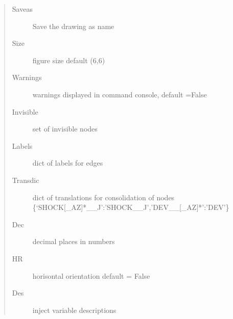 \documentclass[letterpaper,10pt,english]{sphinxmanual}
\begin{document}
\begin{fulllineitems}
\begin{fulllineitems}
\begin{quote}
\begin{description}
\item[{Saveas}] \leavevmode
\sphinxAtStartPar
Save the drawing as name

\item[{Size}] \leavevmode
\sphinxAtStartPar
figure size default (6,6)

\item[{Warnings}] \leavevmode
\sphinxAtStartPar
warnings displayed in command console, default =False

\item[{Invisible}] \leavevmode
\sphinxAtStartPar
set of invisible nodes

\item[{Labels}] \leavevmode
\sphinxAtStartPar
dict of labels for edges

\item[{Transdic}] \leavevmode
\sphinxAtStartPar
dict of translations for consolidation of nodes \{‘SHOCK{[}\_A\sphinxhyphen{}Z{]}*\_\_J’:’SHOCK\_\_J’,’DEV\_\_{[}\_A\sphinxhyphen{}Z{]}*’:’DEV’\}

\item[{Dec}] \leavevmode
\sphinxAtStartPar
decimal places in numbers

\item[{HR}] \leavevmode
\sphinxAtStartPar
horisontal orientation default = False

\item[{Des}] \leavevmode
\sphinxAtStartPar
inject variable descriptions

\end{description}\end{quote}

\end{fulllineitems}


\begin{fulllineitems}
\label{\detokenize{core/modelclass:modelclass.Graph_Draw_Mixin.display_graph_old}}
\pysigstartsignatures
{}
\pysigstopsignatures
\end{fulllineitems}



\end{fulllineitems}
\end{document}
